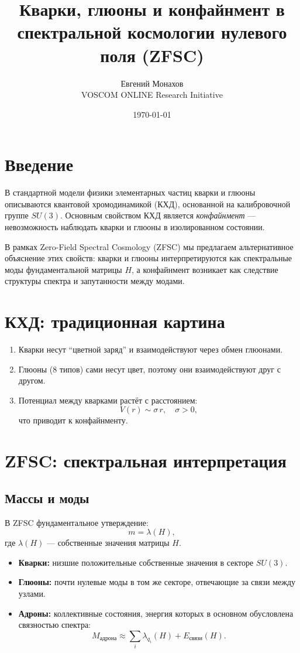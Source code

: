 \documentclass[12pt,a4paper]{article}
\title{Кварки, глюоны и конфайнмент в спектральной космологии нулевого поля (ZFSC)}
\author{Евгений Монахов \\ VOSCOM ONLINE Research Initiative}
\date{\today}
\begin{document}
\maketitle

\section*{Введение}
В стандартной модели физики элементарных частиц кварки и глюоны описываются квантовой хромодинамикой (КХД), основанной на калибровочной группе $SU(3)$. 
Основным свойством КХД является \emph{конфайнмент} --- невозможность наблюдать кварки и глюоны в изолированном состоянии.  

В рамках Zero-Field Spectral Cosmology (ZFSC) мы предлагаем альтернативное объяснение этих свойств: 
кварки и глюоны интерпретируются как спектральные моды фундаментальной матрицы $H$, а конфайнмент возникает как следствие структуры спектра и запутанности между модами.

\section*{КХД: традиционная картина}
\begin{enumerate}
  \item Кварки несут ``цветной заряд'' и взаимодействуют через обмен глюонами.
  \item Глюоны (8 типов) сами несут цвет, поэтому они взаимодействуют друг с другом.
  \item Потенциал между кварками растёт с расстоянием:
  \[
  V(r) \sim \sigma \, r, \quad \sigma > 0,
  \]
  что приводит к конфайнменту.
\end{enumerate}

\section*{ZFSC: спектральная интерпретация}
\subsection*{Массы и моды}
В ZFSC фундаментальное утверждение:
\[
m = \lambda(H),
\]
где $\lambda(H)$ --- собственные значения матрицы $H$.

\begin{itemize}
  \item \textbf{Кварки:} низшие положительные собственные значения в секторе $SU(3)$.
  \item \textbf{Глюоны:} почти нулевые моды в том же секторе, отвечающие за связи между узлами.
  \item \textbf{Адроны:} коллективные состояния, энергия которых в основном обусловлена связностью спектра:
  \[
  M_{\text{адрона}} \approx \sum_i \lambda_{q_i}(H) + E_{\text{связи}}(H).
  \]
\end{itemize}
\end{document}
